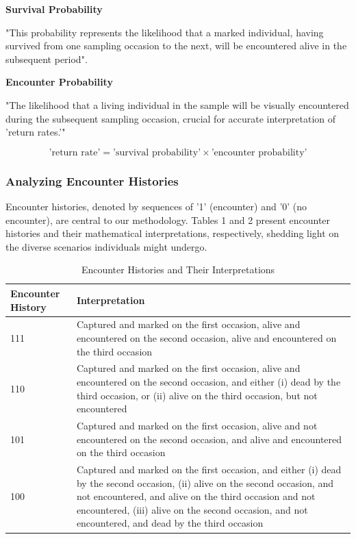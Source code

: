 \documentclass{article}
\begin{document}
\textbf{Survival Probability}

"This probability represents the likelihood that a marked individual, having survived from one sampling occasion to the next, will be encountered alive in the subsequent period".\cite{mark_website}

\textbf{Encounter Probability}

"The likelihood that a living individual in the sample will be visually encountered during the subsequent sampling occasion, crucial for accurate interpretation of 'return rates.'"\cite{mark_website}

\begin{equation}
\text{'return rate'} = \text{'survival probability'} \times \text{'encounter probability'}
\end{equation}

\subsubsection*{Analyzing Encounter Histories}

Encounter histories, denoted by sequences of '1' (encounter) and '0' (no encounter), are central to our methodology. Tables 1 and 2 present encounter histories and their mathematical interpretations, respectively, shedding light on the diverse scenarios individuals might undergo.

\begin{table}
    \begin{tabular}{|l|p{10cm}|}
        \hline
        \textbf{Encounter History} & \textbf{Interpretation} \\
        \hline
        111 & Captured and marked on the first occasion, alive and encountered on the second occasion, alive and encountered on the third occasion \\
        \hline
        110 & Captured and marked on the first occasion, alive and encountered on the second occasion, and either (i) dead by the third occasion, or (ii) alive on the third occasion, but not encountered \\
        \hline
        101 & Captured and marked on the first occasion, alive and not encountered on the second occasion, and alive and encountered on the third occasion \\
        \hline
        100 & Captured and marked on the first occasion, and either (i) dead by the second occasion, (ii) alive on the second occasion, and not encountered, and alive on the third occasion and not encountered, (iii) alive on the second occasion, and not encountered, and dead by the third occasion \\
        \hline
    \end{tabular}
    \caption{Encounter Histories and Their Interpretations\cite{mark_website}}
\end{table}
\end{document}
